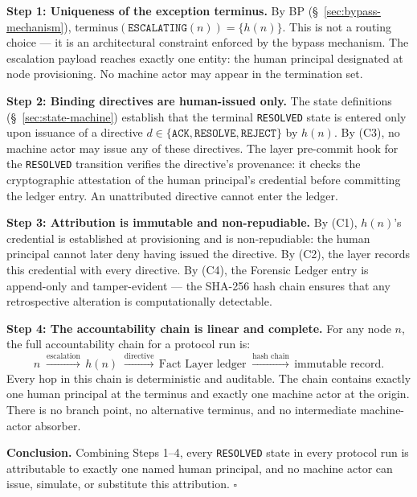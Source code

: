 \medskip
\noindent\textbf{Step 1: Uniqueness of the exception terminus.} By BP (\S~\ref{sec:bypass-mechanism}), $\text{terminus}(\texttt{ESCALATING}(n)) = \{h(n)\}$. This is not a routing choice — it is an architectural constraint enforced by the bypass mechanism. The escalation payload reaches exactly one entity: the human principal designated at node provisioning. No machine actor may appear in the termination set.

\medskip
\noindent\textbf{Step 2: Binding directives are human-issued only.} The state definitions (\S~\ref{sec:state-machine}) establish that the terminal \texttt{RESOLVED} state is entered only upon issuance of a directive $d \in \{\texttt{ACK}, \texttt{RESOLVE}, \texttt{REJECT}\}$ by $h(n)$. By (C3), no machine actor may issue any of these directives. The \fact{} layer pre-commit hook for the \texttt{RESOLVED} transition verifies the directive's provenance: it checks the cryptographic attestation of the human principal's credential before committing the ledger entry. An unattributed directive cannot enter the ledger.

\medskip
\noindent\textbf{Step 3: Attribution is immutable and non-repudiable.} By (C1), $h(n)$'s credential is established at provisioning and is non-repudiable: the human principal cannot later deny having issued the directive. By (C2), the \fact{} layer records this credential with every directive. By (C4), the Forensic Ledger entry is append-only and tamper-evident — the SHA-256 hash chain ensures that any retrospective alteration is computationally detectable.

\medskip
\noindent\textbf{Step 4: The accountability chain is linear and complete.} For any node $n$, the full accountability chain for a protocol run is:
\[
n \; \xrightarrow{\text{escalation}}\, h(n) \; \xrightarrow{\text{directive}}\, \text{Fact Layer ledger} \; \xrightarrow{\text{hash chain}}\, \text{immutable record}.
\]
Every hop in this chain is deterministic and auditable. The chain contains exactly one human principal at the terminus and exactly one machine actor at the origin. There is no branch point, no alternative terminus, and no intermediate machine-actor absorber.

\medskip
\noindent\textbf{Conclusion.} Combining Steps 1--4, every \texttt{RESOLVED} state in every protocol run is attributable to exactly one named human principal, and no machine actor can issue, simulate, or substitute this attribution. $\square$

